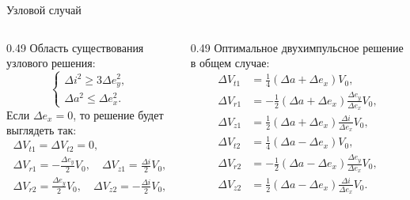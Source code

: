 \documentclass[9pt]{beamer}
\begin{document}
\begin{frame}{Узловой случай}
\begin{columns}[T,onlytextwidth]
  \begin{column}{0.49\textwidth}
    Область существования узлового решения:
    \begin{equation*}
    \begin{cases}
        \Delta i^2 \geq 3\Delta e_y^2, \\
        \Delta a^2 \leq \Delta e_x^2.
    \end{cases}
    \end{equation*}
    Если $\Delta e_x = 0$, то решение будет выглядеть так:
    \begin{gather*}
        \Delta V_{t1} = \Delta V_{t2} = 0, \\
        \Delta V_{r1} = - \frac{\Delta e_y}{2} V_0, \quad \Delta V_{z1} = \frac{\Delta i}{2} V_0, \\
        \Delta V_{r2} = \frac{\Delta e_y}{2} V_0, \quad \Delta V_{z2} = - \frac{\Delta i}{2} V_0,
    \end{gather*}
  \end{column}

  \begin{column}{0.49\textwidth}
    Оптимальное двухимпульсное решение в общем случае:
    \begin{align*}
        \Delta V_{t1} &= \frac{1}{4} (\Delta a + \Delta e_x) V_0, \\
        \Delta V_{r1} &= -\frac{1}{2} (\Delta a + \Delta e_x) \frac{\Delta e_y}{\Delta e_x} V_0, \\
        \Delta V_{z1} &= \frac{1}{2} (\Delta a + \Delta e_x) \frac{\Delta i}{\Delta e_x} V_0, \\
        \Delta V_{t2} &= \frac{1}{4} (\Delta a - \Delta e_x) V_0, \\
        \Delta V_{r2} &= -\frac{1}{2} (\Delta a - \Delta e_x) \frac{\Delta e_y}{\Delta e_x} V_0, \\
        \Delta V_{z2} &= \frac{1}{2} (\Delta a - \Delta e_x) \frac{\Delta i}{\Delta e_x} V_0.
    \end{align*}
  \end{column}
\end{columns}
\end{frame}
\end{document}
